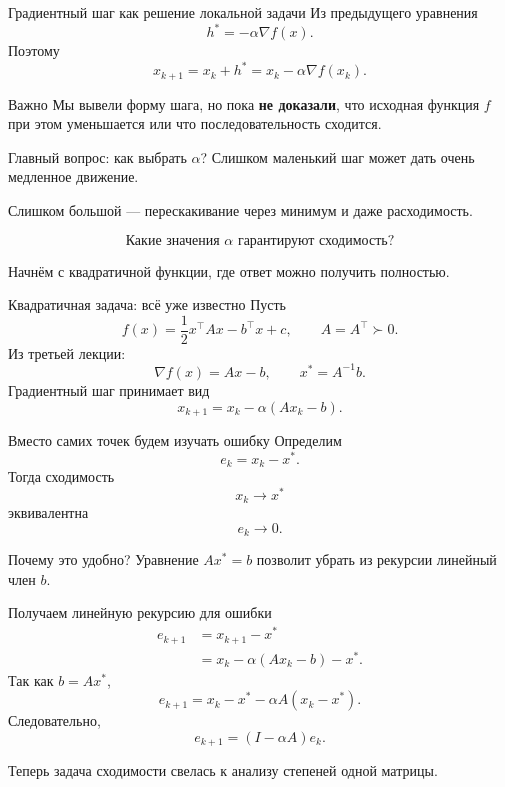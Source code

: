 \documentclass[aspectratio=169,10pt]{beamer}
\newcommand{\grad}{\nabla}
\begin{document}
\begin{frame}{Градиентный шаг как решение локальной задачи}
\small
Из предыдущего уравнения
\[
 \boxed{h^*=-\alpha\grad f(x).}
\]
Поэтому
\[
 x_{k+1}=x_k+h^*
 =\boxed{x_k-\alpha\grad f(x_k)}.
\]

\begin{alertblock}{Важно}
Мы вывели форму шага, но пока \textbf{не доказали}, что исходная функция $f$ при этом уменьшается или что последовательность сходится.
\end{alertblock}
\end{frame}

\begin{frame}{Главный вопрос: как выбрать $\alpha$?}
\small
Слишком маленький шаг может дать очень медленное движение.

Слишком большой --- перескакивание через минимум и даже расходимость.

\begin{center}
\Large
\[
 \boxed{\text{Какие значения }\alpha\text{ гарантируют сходимость?}}
\]
\end{center}

Начнём с квадратичной функции, где ответ можно получить полностью.
\end{frame}

\begin{frame}{Квадратичная задача: всё уже известно}
\small
Пусть
\[
 f(x)=\frac12x^\top Ax-b^\top x+c,
 \qquad A=A^\top\succ0.
\]
Из третьей лекции:
\[
 \grad f(x)=Ax-b,
 \qquad
 x^*=A^{-1}b.
\]
Градиентный шаг принимает вид
\[
 \boxed{
 x_{k+1}=x_k-\alpha(Ax_k-b).
 }
\]
\end{frame}

\begin{frame}{Вместо самих точек будем изучать ошибку}
\small
Определим
\[
 \boxed{e_k=x_k-x^*.}
\]
Тогда сходимость
\[
 x_k\to x^*
\]
эквивалентна
\[
 e_k\to0.
\]

\begin{block}{Почему это удобно?}
Уравнение $Ax^*=b$ позволит убрать из рекурсии линейный член $b$.
\end{block}
\end{frame}

\begin{frame}{Получаем линейную рекурсию для ошибки}
\footnotesize
\[
\begin{aligned}
 e_{k+1}
 &=x_{k+1}-x^*\\
 &=x_k-\alpha(Ax_k-b)-x^*.
\end{aligned}
\]
Так как $b=Ax^*$,
\[
 e_{k+1}
 =x_k-x^*-\alpha A(x_k-x^*).
\]
Следовательно,
\[
 \boxed{
 e_{k+1}=(I-\alpha A)e_k.
 }
\]

Теперь задача сходимости свелась к анализу степеней одной матрицы.
\end{frame}
\end{document}
